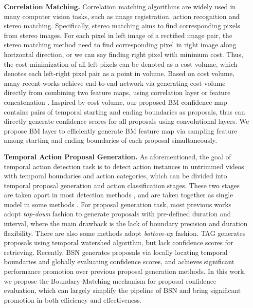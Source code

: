 \documentclass[10pt,twocolumn,letterpaper]{article}
\begin{document}
\noindent
\textbf{Correlation Matching.}
Correlation matching algorithms are widely used in many computer vision tasks, such as image registration, action recognition and stereo matching.
Specifically, stereo matching aims to find corresponding pixels from stereo images. For each pixel in left image of a rectified image pair, the stereo matching method need to find corresponding pixel in right image along horizontal direction, or we can say finding right pixel with minimum cost.
Thus, the cost minimization of all left pixels can be denoted as a cost volume, which denotes each left-right pixel pair as a point in volume.
Based on cost volume, many recent works \cite{song2018edgestereo,mayer2016large,liang2017learning} achieve end-to-end network via generating cost volume directly from combining two feature maps, using correlation layer \cite{mayer2016large} or feature concatenation \cite{chang2018pyramid}.
Inspired by cost volume, our proposed BM confidence map contains pairs of temporal starting and ending boundaries as proposals, thus can directly generate confidence scores for all proposals using convolutional layers.
We propose BM layer to efficiently generate BM feature map via sampling feature among starting and ending boundaries of each proposal simultaneously.



\noindent
\textbf{Temporal Action Proposal Generation.}
As aforementioned, the goal of temporal action detection task is to detect action instances in untrimmed videos with temporal boundaries and action categories, which can be divided into temporal proposal generation and action classification stages.
These two stages are taken apart in most detection methods \cite{shou2016action,singh2016untrimmed,zhao2017temporal}, and are taken together as single model in some methods \cite{ssad,sstad}.
For proposal generation task, most previous works \cite{sst_buch_cvpr17,fast_temporal_activity_cvpr16, escorcia2016daps, gao2017turn,shou2016action}  adopt \emph{top-down} fashion to generate proposals with pre-defined duration and interval, where the main drawback is the lack of boundary precision and duration flexibility.
There are also some methods \cite{zhao2017temporal,lin2018bsn} adopt \emph{bottom-up} fashion. TAG \cite{zhao2017temporal} generates proposals using temporal watershed algorithm, but lack confidence scores for retrieving. Recently, BSN \cite{lin2018bsn} generates proposals via locally locating temporal boundaries and globally evaluating confidence scores, and achieves significant performance promotion over previous proposal generation methods.
In this work, we propose the Boundary-Matching mechanism for proposal confidence evaluation, which can largely simplify the pipeline of BSN and bring significant promotion in both efficiency and effectiveness.
\end{document}
